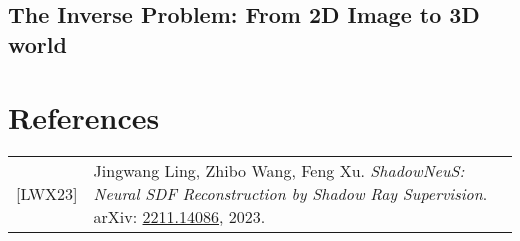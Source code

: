 \documentclass[12pt]{article}
\begin{document}
\newpage

\subsection{The Inverse Problem: From 2D Image to 3D world}



\newpage
\section*{References}
\begin{tabular}{@{}p{} p{}}
{[LWX23]} & Jingwang Ling, Zhibo Wang, Feng Xu. \textit{ShadowNeuS: Neural SDF Reconstruction by Shadow Ray Supervision}. arXiv: \href{https://arxiv.org/abs/2211.14086}{2211.14086}, 2023.
\end{tabular}
\end{document}
